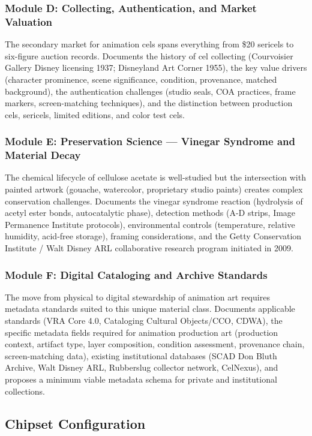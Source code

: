 \documentclass[11pt,letterpaper]{article}
\begin{document}
\subsubsection{Module D: Collecting, Authentication, and Market Valuation}
The secondary market for animation cels spans everything from \$20 sericels to six-figure auction records. Documents the history of cel collecting (Courvoisier Gallery Disney licensing 1937; Disneyland Art Corner 1955), the key value drivers (character prominence, scene significance, condition, provenance, matched background), the authentication challenges (studio seals, COA practices, frame markers, screen-matching techniques), and the distinction between production cels, sericels, limited editions, and color test cels.

\subsubsection{Module E: Preservation Science --- Vinegar Syndrome and Material Decay}
The chemical lifecycle of cellulose acetate is well-studied but the intersection with painted artwork (gouache, watercolor, proprietary studio paints) creates complex conservation challenges. Documents the vinegar syndrome reaction (hydrolysis of acetyl ester bonds, autocatalytic phase), detection methods (A-D strips, Image Permanence Institute protocols), environmental controls (temperature, relative humidity, acid-free storage), framing considerations, and the Getty Conservation Institute / Walt Disney ARL collaborative research program initiated in 2009.

\subsubsection{Module F: Digital Cataloging and Archive Standards}
The move from physical to digital stewardship of animation art requires metadata standards suited to this unique material class. Documents applicable standards (VRA Core 4.0, Cataloging Cultural Objects/CCO, CDWA), the specific metadata fields required for animation production art (production context, artifact type, layer composition, condition assessment, provenance chain, screen-matching data), existing institutional databases (SCAD Don Bluth Archive, Walt Disney ARL, Rubberslug collector network, CelNexus), and proposes a minimum viable metadata schema for private and institutional collections.

\subsection{Chipset Configuration}
\end{document}
